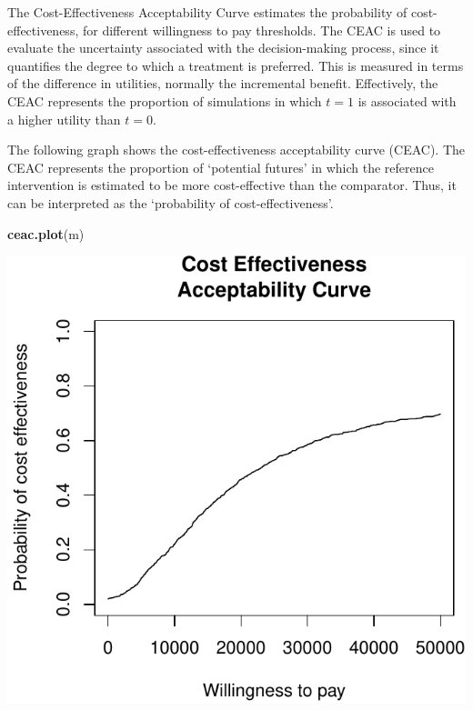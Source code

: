 \documentclass[]{article}
\newenvironment{Shaded}{\begin{snugshade}}{\end{snugshade}}
\newcommand{\KeywordTok}[1]{\textcolor[rgb]{0.13,0.29,0.53}{\textbf{#1}}}
\newcommand{\NormalTok}[1]{#1}
\begin{document}
The Cost-Effectiveness Acceptability Curve estimates the probability of
cost-effectiveness, for different willingness to pay thresholds. The
CEAC is used to evaluate the uncertainty associated with the
decision-making process, since it quantifies the degree to which a
treatment is preferred. This is measured in terms of the difference in
utilities, normally the incremental benefit. Effectively, the CEAC
represents the proportion of simulations in which \(t=1\) is associated
with a higher utility than \(t=0\).

The following graph shows the cost-effectiveness acceptability curve
(CEAC). The CEAC represents the proportion of `potential futures' in
which the reference intervention is estimated to be more cost-effective
than the comparator. Thus, it can be interpreted as the `probability of
cost-effectiveness'.

\begin{Shaded}
\begin{Highlighting}[]
\KeywordTok{ceac.plot}\NormalTok{(m)}
\end{Highlighting}
\end{Shaded}

\begin{center}\includegraphics{report_files/figure-latex/unnamed-chunk-5-1} \end{center}
\end{document}
